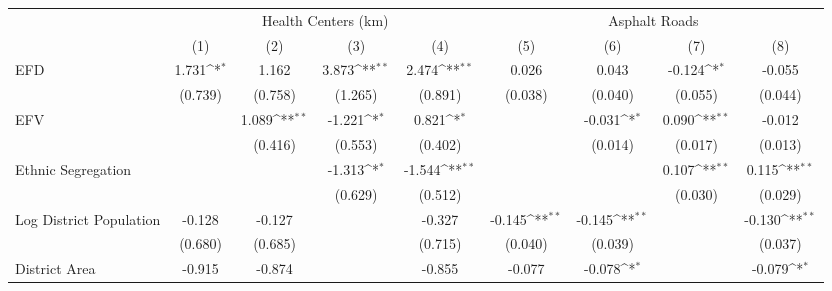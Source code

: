 {
\def\sym#1{\ifmmode^{#1}\else\(^{#1}\)\fi}
\begin{tabular}{l*{8}{c}}
\toprule
                    &\multicolumn{4}{c}{Health Centers (km)}                                            &\multicolumn{4}{c}{Asphalt Roads}                                                  \\\cmidrule(lr){2-5}\cmidrule(lr){6-9}
                    &\multicolumn{1}{c}{(1)}        &\multicolumn{1}{c}{(2)}        &\multicolumn{1}{c}{(3)}        &\multicolumn{1}{c}{(4)}        &\multicolumn{1}{c}{(5)}        &\multicolumn{1}{c}{(6)}        &\multicolumn{1}{c}{(7)}        &\multicolumn{1}{c}{(8)}        \\
\midrule
EFD                 &       1.731\sym{*} &       1.162        &       3.873\sym{**}&       2.474\sym{**}&       0.026        &       0.043        &      -0.124\sym{*} &      -0.055        \\
                    &     (0.739)        &     (0.758)        &     (1.265)        &     (0.891)        &     (0.038)        &     (0.040)        &     (0.055)        &     (0.044)        \\
EFV                 &                    &       1.089\sym{**}&      -1.221\sym{*} &       0.821\sym{*} &                    &      -0.031\sym{*} &       0.090\sym{**}&      -0.012        \\
                    &                    &     (0.416)        &     (0.553)        &     (0.402)        &                    &     (0.014)        &     (0.017)        &     (0.013)        \\
Ethnic Segregation  &                    &                    &      -1.313\sym{*} &      -1.544\sym{**}&                    &                    &       0.107\sym{**}&       0.115\sym{**}\\
                    &                    &                    &     (0.629)        &     (0.512)        &                    &                    &     (0.030)        &     (0.029)        \\
Log District Population&      -0.128        &      -0.127        &                    &      -0.327        &      -0.145\sym{**}&      -0.145\sym{**}&                    &      -0.130\sym{**}\\
                    &     (0.680)        &     (0.685)        &                    &     (0.715)        &     (0.040)        &     (0.039)        &                    &     (0.037)        \\
District Area       &      -0.915        &      -0.874        &                    &      -0.855        &      -0.077        &      -0.078\sym{*} &                    &      -0.079\sym{*} \\

\end{tabular}}
